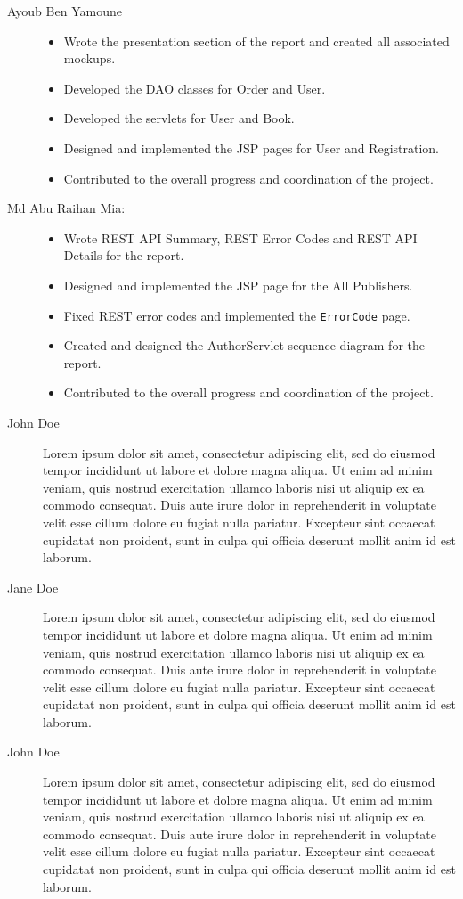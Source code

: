 \begin{description}
	\item[Ayoub Ben Yamoune] 	    
	\begin{itemize}
		\item Wrote the presentation section of the report and created all associated mockups.
		\item Developed the DAO classes for Order and User.
		\item Developed the servlets for User and Book.
		\item Designed and implemented the JSP pages for User and Registration.
		\item Contributed to the overall progress and coordination of the project.
	\end{itemize}
	
	\item[Md Abu Raihan Mia:] \hfill
	\begin{itemize} 
	\item Wrote REST API Summary, REST Error Codes and REST API Details for the report.
	\item Designed and implemented the JSP page for the All Publishers.
	\item Fixed REST error codes and implemented the \texttt{ErrorCode} page.
	\item Created and designed the AuthorServlet sequence diagram for the report.
	\item Contributed to the overall progress and coordination of the project.
	\end{itemize}

	\item[John Doe] Lorem ipsum dolor sit amet, consectetur adipiscing elit, sed do eiusmod tempor incididunt ut labore et dolore magna aliqua. Ut enim ad minim veniam, quis nostrud exercitation ullamco laboris nisi ut aliquip ex ea commodo consequat. Duis aute irure dolor in reprehenderit in voluptate velit esse cillum dolore eu fugiat nulla pariatur. Excepteur sint occaecat cupidatat non proident, sunt in culpa qui officia deserunt mollit anim id est laborum.
	\item[Jane Doe] Lorem ipsum dolor sit amet, consectetur adipiscing elit, sed do eiusmod tempor incididunt ut labore et dolore magna aliqua. Ut enim ad minim veniam, quis nostrud exercitation ullamco laboris nisi ut aliquip ex ea commodo consequat. Duis aute irure dolor in reprehenderit in voluptate velit esse cillum dolore eu fugiat nulla pariatur. Excepteur sint occaecat cupidatat non proident, sunt in culpa qui officia deserunt mollit anim id est laborum.
	\item[John Doe] Lorem ipsum dolor sit amet, consectetur adipiscing elit, sed do eiusmod tempor incididunt ut labore et dolore magna aliqua. Ut enim ad minim veniam, quis nostrud exercitation ullamco laboris nisi ut aliquip ex ea commodo consequat. Duis aute irure dolor in reprehenderit in voluptate velit esse cillum dolore eu fugiat nulla pariatur. Excepteur sint occaecat cupidatat non proident, sunt in culpa qui officia deserunt mollit anim id est laborum.

\end{description}
